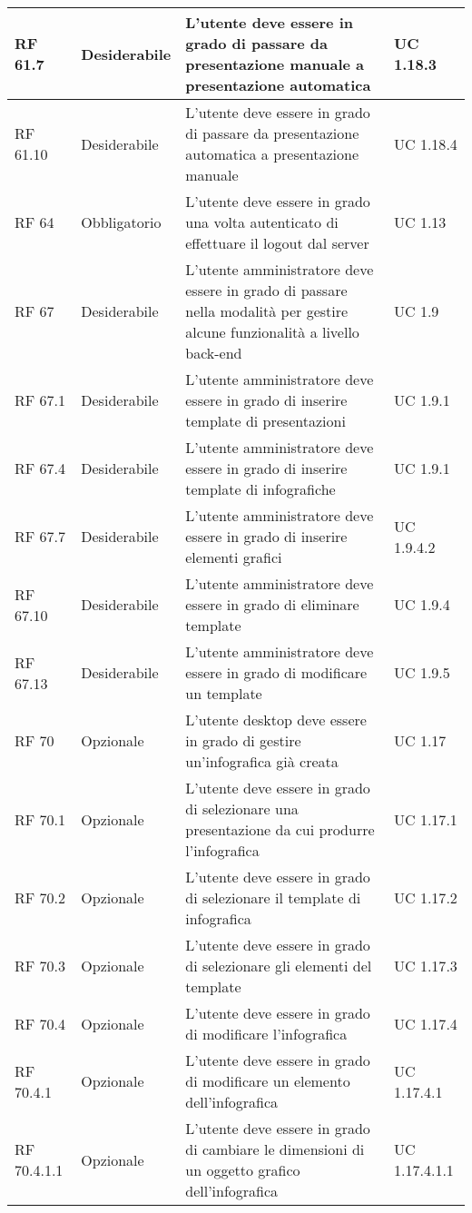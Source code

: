 {\begin{longtable} [c]{| p{2.5cm} | p{2.5cm} | p{6cm} |p{2.5cm}|}
			\hline
			RF 61.7 & Desiderabile & L'utente deve essere in grado di passare da presentazione manuale a presentazione automatica & UC 1.18.3\\
			\hline
			RF 61.10 & Desiderabile & L'utente deve essere in grado di passare da presentazione automatica a presentazione manuale & UC 1.18.4\\
			\hline
			RF 64 & Obbligatorio & L'utente deve essere in grado una volta autenticato di effettuare il logout dal server & UC 1.13\\
			\hline
			RF 67 & Desiderabile & L'utente amministratore deve essere in grado di passare nella modalità per gestire alcune funzionalità a livello back-end & UC 1.9\\
			\hline
			RF 67.1 & Desiderabile & L'utente amministratore deve essere in grado di inserire template di presentazioni & UC 1.9.1\\
			\hline
			RF 67.4 & Desiderabile & L'utente amministratore deve essere in grado di inserire template di infografiche & UC 1.9.1\\
			\hline
			RF 67.7 & Desiderabile & L'utente amministratore deve essere in grado di inserire elementi grafici & UC 1.9.4.2\\
			\hline
			RF 67.10 & Desiderabile & L'utente amministratore deve essere in grado di eliminare template & UC 1.9.4\\
			\hline
			RF 67.13 & Desiderabile & L'utente amministratore deve essere in grado di modificare un template & UC 1.9.5\\
			\hline
			RF 70 & Opzionale & L'utente desktop deve essere in grado di gestire un'infografica già creata & UC 1.17\\
			\hline
			RF 70.1 & Opzionale & L'utente deve essere in grado di selezionare una presentazione da cui produrre l'infografica & UC 1.17.1\\
			\hline
			RF 70.2 & Opzionale & L'utente deve essere in grado di selezionare il template di infografica & UC 1.17.2\\
			\hline
			RF 70.3 & Opzionale & L'utente deve essere in grado di selezionare gli elementi del template & UC 1.17.3\\
			\hline
			RF 70.4 & Opzionale & L'utente deve essere in grado di modificare l'infografica & UC 1.17.4\\
			\hline
			RF 70.4.1 & Opzionale & L'utente deve essere in grado di modificare un elemento dell'infografica & UC 1.17.4.1\\
			\hline
			RF 70.4.1.1 & Opzionale & L'utente deve essere in grado di cambiare le dimensioni di un oggetto grafico dell'infografica & UC 1.17.4.1.1\\

\end{longtable}}
